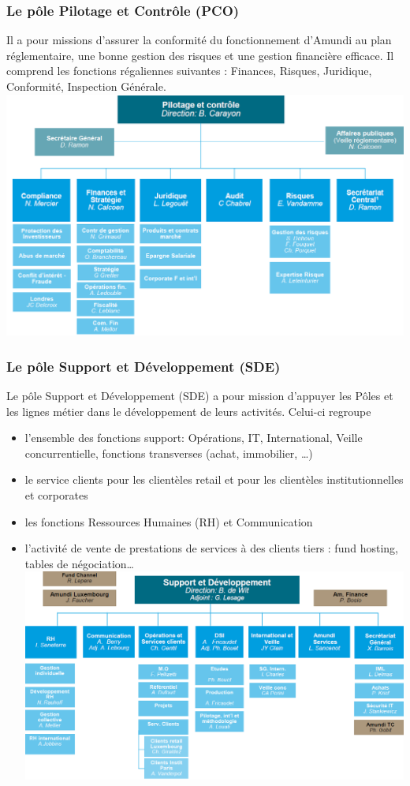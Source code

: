 \documentclass[12pt,a4paper]{report}
\begin{document}
\subsubsection{Le pôle Pilotage et Contrôle (PCO)}
Il a pour missions d’assurer la conformité du fonctionnement d’Amundi au plan réglementaire, une bonne gestion des risques et une gestion financière efficace.
Il comprend les fonctions régaliennes suivantes : Finances, Risques, Juridique, Conformité, Inspection Générale. \vspace{0.5cm}
\newline
\includegraphics[scale=0.7]{IMG/orga2.png} 
\subsubsection{Le pôle Support et Développement (SDE)}
Le pôle Support et Développement (SDE) a pour mission d’appuyer les Pôles et les lignes métier dans le développement de leurs activités. Celui-ci regroupe
\begin{itemize}
\item l’ensemble des fonctions support: Opérations, IT, International, Veille concurrentielle, fonctions transverses (achat, immobilier, …)
\item le service clients pour les clientèles retail et pour les clientèles institutionnelles et corporates
\item les fonctions Ressources Humaines (RH) et Communication
\item l’activité de vente de prestations de services à des clients tiers : fund hosting, tables de négociation…
\vspace{0.5cm}
\newline
\includegraphics[scale=0.7]{IMG/orga3.png} 
\end{itemize}
\end{document}
